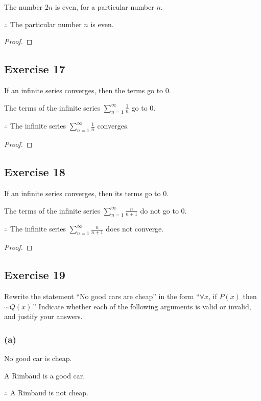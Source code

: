\documentclass[14pt]{extarticle}
\newcommand{\dps}{\displaystyle}
\newcommand{\fa}{\forall}
\begin{document}
The number $2n$ is even, for a particular number $n$.

$\therefore$ The particular number $n$ is even.

\begin{proof}

\end{proof}

\subsection{Exercise 17}
If an infinite series converges, then the terms go to 0.

The terms of the infinite series $\dps \sum_{n = 1}^{\infty} \frac{1}{n}$ go to 0.

$\therefore$ The infinite series $\dps \sum_{n = 1}^{\infty} \frac{1}{n}$ converges.

\begin{proof}

\end{proof}

\subsection{Exercise 18}
If an infinite series converges, then its terms go to 0.

The terms of the infinite series $\dps \sum_{n = 1}^{\infty} \frac{n}{n+1}$ do not go to 0.

$\therefore$ The infinite series $\dps \sum_{n = 1}^{\infty} \frac{n}{n+1}$ does not converge.

\begin{proof}

\end{proof}

\subsection{Exercise 19}
Rewrite the statement “No good cars are cheap” in the form “$\fa x$, if $P(x)$ then $\sim Q(x)$.” Indicate whether each of the following arguments is valid or invalid, and justify your answers.

\subsubsection{(a)}
No good car is cheap.

A Rimbaud is a good car.

$\therefore$ A Rimbaud is not cheap.
\end{document}
